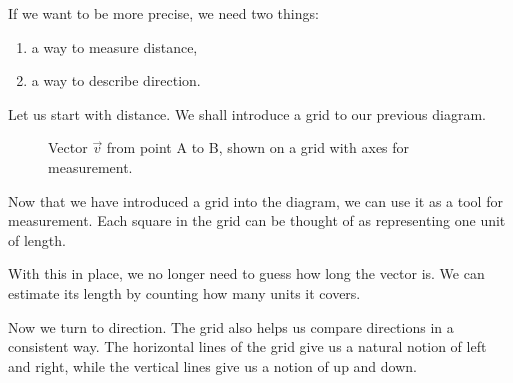 \documentclass[11pt,openany]{book}
\theoremstyle{definition}
\begin{document}
\medskip

If we want to be more precise, we need two things:

\begin{enumerate}
  \item a way to measure distance,
  \item a way to describe direction.
\end{enumerate}

\medskip

Let us start with distance. We shall introduce a grid to our previous diagram.

\begin{figure}[H]
\centering
{}
\caption{Vector $\vec{v}$ from point A to B, shown on a grid with axes for measurement.}
\end{figure}

Now that we have introduced a grid into the diagram, we can use it as a tool for measurement. 
Each square in the grid can be thought of as representing one unit of length.

\medskip

With this in place, we no longer need to guess how long the vector is. 
We can estimate its length by counting how many units it covers.

\medskip

Now we turn to direction. The grid also helps us compare directions in a consistent way. 
The horizontal lines of the grid give us a natural notion of left and right, while the vertical lines give us a notion of up and down.
\end{document}
